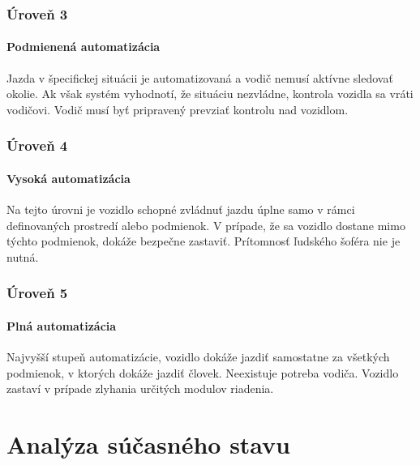 \subsubsection{Úroveň 3}
\paragraph{Podmienená automatizácia}Jazda v špecifickej situácii je automatizovaná a vodič nemusí aktívne sledovať okolie. Ak však systém vyhodnotí, že situáciu nezvládne, kontrola vozidla sa vráti vodičovi. Vodič musí byť pripravený prevziať kontrolu nad vozidlom.
\subsubsection{Úroveň 4}
\paragraph{Vysoká automatizácia}Na tejto úrovni je vozidlo schopné zvládnuť jazdu úplne samo v rámci definovaných prostredí alebo podmienok. V prípade, že sa vozidlo dostane mimo týchto podmienok, dokáže bezpečne zastaviť. Prítomnosť ľudského šoféra nie je nutná.
\subsubsection{Úroveň 5}
\paragraph{Plná automatizácia}Najvyšší stupeň automatizácie, vozidlo dokáže jazdiť samostatne za všetkých podmienok, v ktorých dokáže jazdiť človek. Neexistuje potreba vodiča. Vozidlo zastaví v prípade zlyhania určitých modulov riadenia.

\section{Analýza súčasného stavu}\label{sec:Analyza}
